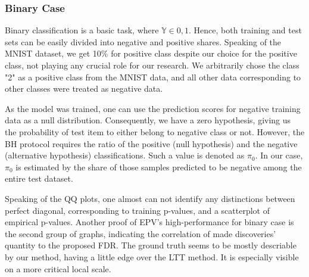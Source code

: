 \documentclass{article}
\begin{document}
\subsubsection{Binary Case}

Binary classification is a basic task, where $\mathbb{Y} \in {0, 1}$. Hence, both training and test sets can be easily divided into negative and positive shares. Speaking of the MNIST dataset, we get 10\% for positive class despite our choice for the positive class, not playing any crucial role for our research. We arbitrarily chose the class "2" as a positive class from the MNIST data, and all other data corresponding to other classes were treated as negative data. 

As the model was trained, one can use the prediction scores for negative training data as a null distribution. Consequently, we have a zero hypothesis, giving us the probability of test item to either belong to negative class or not. However, the BH protocol requires
the ratio of the positive (null hypothesis) and the negative (alternative hypothesis) classifications. Such a value is denoted as $\pi_0$. In our case, $\pi_0$ is estimated by the share of those samples predicted to be negative among the entire test dataset.  

Speaking of the QQ plots, one almost can not identify any distinctions between perfect diagonal, corresponding to training p-values, and a scatterplot of empirical p-values. Another proof of EPV's high-performance for binary case is the second group of graphs, indicating the correlation of made discoveries' quantity to the proposed FDR. The ground truth seems to be mostly descriable by our method, having a little edge over the LTT method. It is especially visible on a more critical local scale.
\end{document}
